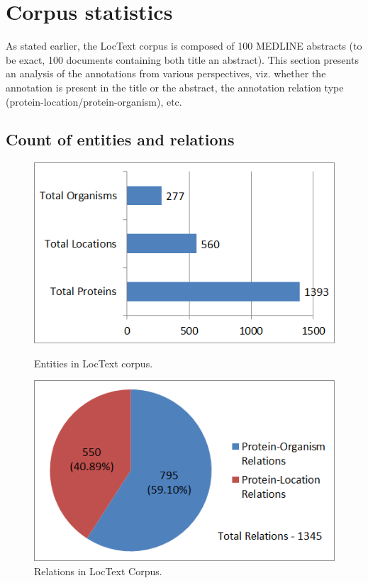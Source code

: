 \section{Corpus statistics}\label{sec:corpusStats}


As stated earlier, the LocText corpus is composed of 100 MEDLINE abstracts (to be exact, 100 documents containing both title an abstract). This section presents an analysis of the annotations from various perspectives, viz. whether the annotation is present in the title or the abstract, the annotation relation type (protein-location/protein-organism), etc.

\subsection*{Count of entities and relations}

\begin{figure}
\centering
\begin{minipage}{.5\textwidth}
  \centering
  \includegraphics[width=.95\textwidth]{figures/ProtLocOrg_Distribution.png}
  \caption{Entities in LocText corpus.}
  \label{fig:LocText_Entities}
\end{minipage}%
\begin{minipage}{.5\textwidth}
  \centering
  \includegraphics[width=.95\textwidth]{figures/AllRelationsPie.png}
  \caption{Relations in LocText Corpus.}
  \label{fig:LocText_Relations}
\end{minipage}
\end{figure}

